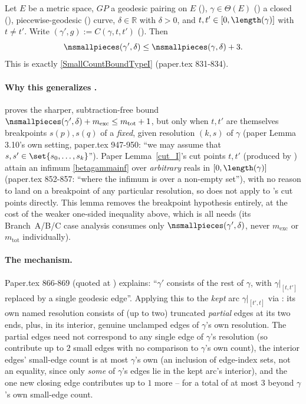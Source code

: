 \begin{lemma}
  Let $E$ be a metric space, $GP$ a geodesic pairing on $E$ (), $\gamma \in
  \Theta(E)$ () a closed (), piecewise-geodesic
  () curve, $\delta \in \mathbb{R}$ with $\delta > 0$, and
  $t,t' \in [0,\length(\gamma)]$ with $t \ne t'$. Write $(\gamma',g) := C(\gamma,t,t')$
  (). Then
  \[
    \nsmallpieces(\gamma',\delta) \le \nsmallpieces(\gamma,\delta) + 3
    .
  \]
  This is exactly \eqref{SmallCountBoundTypeI} (paper.tex 831-834).

  \paragraph{Why this generalizes .}
   proves the sharper, subtraction-free bound
  $\nsmallpieces(\gamma',\delta)+m_{\mathrm{exc}} \le m_{\mathrm{tot}}+1$, but only when $t,t'$ are
  themselves breakpoints $s(p),s(q)$ of a \emph{fixed}, given resolution $(k,s)$ of $\gamma$ (paper
  Lemma 3.10's own setting, paper.tex 947-950: ``we may assume that $s,s' \in \set{s_0,\dots,s_k}$'').
  Paper Lemma~\ref{cut_I}'s cut points $t,t'$ (produced by ) attain an
  infimum \eqref{betagammainf} over \emph{arbitrary} reals in $[0,\length(\gamma)]$ (paper.tex
  852-857: ``where the infimum is over a non-empty set''), with no reason to land on a breakpoint
  of any particular resolution, so  does not apply to
  's cut points directly. This lemma removes the breakpoint hypothesis entirely,
  at the cost of the weaker one-sided inequality above, which is all  needs (its
  Branch~A/B/C case analysis consumes only $\nsmallpieces(\gamma',\delta)$, never
  $m_{\mathrm{exc}}$ or $m_{\mathrm{tot}}$ individually).

  \paragraph{The mechanism.} Paper.tex 866-869 (quoted at ) explains: ``$\gamma'$
  consists of the rest of $\gamma$, with $\gamma|_{[t,t']}$ replaced by a single geodesic edge''.
  Applying this to the \emph{kept} arc $\gamma|_{[t',t]}$ via : its
  own named resolution consists of (up to two) truncated \emph{partial} edges at its two ends,
  plus, in its interior, genuine unclamped edges of $\gamma$'s own resolution. The partial edges
  need not correspond to any single edge of $\gamma$'s resolution (so contribute up to $2$ small
  edges with no comparison to $\gamma$'s own count), the interior edges' small-edge count is at
  most $\gamma$'s own (an inclusion of edge-index sets, not an equality, since only \emph{some} of
  $\gamma$'s edges lie in the kept arc's interior), and the one new closing edge contributes up to
  $1$ more -- for a total of at most $3$ beyond $\gamma$'s own small-edge count.
\end{lemma}
